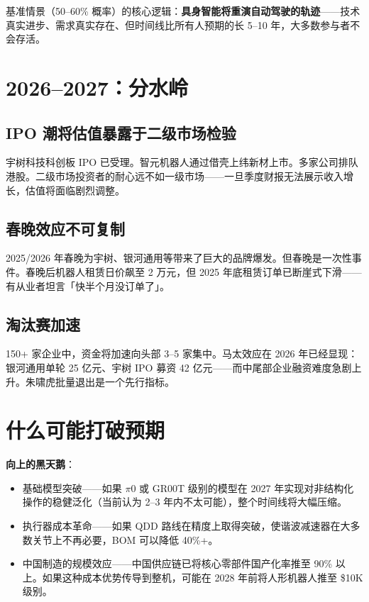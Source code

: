 基准情景（50--60\% 概率）的核心逻辑：\textbf{具身智能将重演自动驾驶的轨迹}——技术真实进步、需求真实存在、但时间线比所有人预期的长 5--10 年，大多数参与者不会存活。

\section{2026--2027：分水岭}

\subsection{IPO 潮将估值暴露于二级市场检验}

宇树科技科创板 IPO 已受理。智元机器人通过借壳上纬新材上市。多家公司排队港股。二级市场投资者的耐心远不如一级市场——一旦季度财报无法展示收入增长，估值将面临剧烈调整。

\subsection{春晚效应不可复制}

2025/2026 年春晚为宇树、银河通用等带来了巨大的品牌爆发。但春晚是一次性事件。春晚后机器人租赁日价飙至 2 万元，但 2025 年底租赁订单已断崖式下滑——有从业者坦言「快半个月没订单了」\cite{caijing2026robots}。

\subsection{淘汰赛加速}

150+ 家企业中，资金将加速向头部 3--5 家集中。马太效应在 2026 年已经显现：银河通用单轮 25 亿元、宇树 IPO 募资 42 亿元——而中尾部企业融资难度急剧上升。朱啸虎批量退出是一个先行指标\cite{zhuxiaohu2025exit}。

\section{什么可能打破预期}

\textbf{向上的黑天鹅}：
\begin{itemize}
  \item 基础模型突破——如果 $\pi$0 或 GR00T 级别的模型在 2027 年实现对非结构化操作的稳健泛化（当前认为 2--3 年内不太可能），整个时间线将大幅压缩。
  \item 执行器成本革命——如果 QDD 路线在精度上取得突破，使谐波减速器在大多数关节上不再必要，BOM 可以降低 40\%+。
  \item 中国制造的规模效应——中国供应链已将核心零部件国产化率推至 90\% 以上\cite{gasgoo2026dexterous}。如果这种成本优势传导到整机，可能在 2028 年前将人形机器人推至 \$10K 级别。
\end{itemize}


